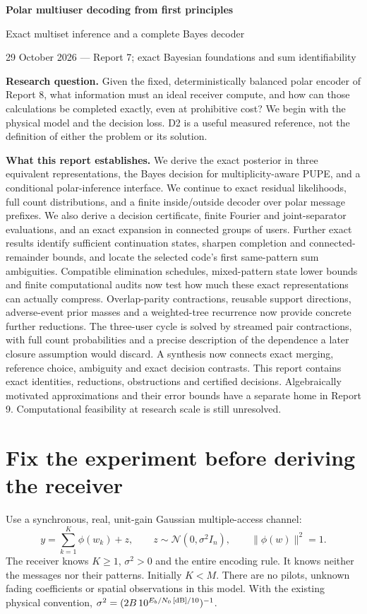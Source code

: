 \documentclass[10pt,a4paper]{article}
\begin{document}
{\LARGE\bfseries Polar multiuser decoding from first principles}\par
{\large Exact multiset inference and a complete Bayes decoder}\par
{\color{muted}29 October 2026 --- Report 7; exact Bayesian foundations and sum identifiability}

\textbf{Research question.} Given the fixed, deterministically balanced polar encoder of Report 8, what information
must an ideal receiver compute, and how can those calculations be completed exactly, even at prohibitive cost?
We begin with the physical model and the decision loss. D2 is a useful measured reference, not the
definition of either the problem or its solution.

\textbf{What this report establishes.} We derive the exact posterior in three equivalent representations, the
Bayes decision for multiplicity-aware PUPE, and a conditional polar-inference interface. We continue to exact
residual likelihoods, full count distributions, and a finite inside/outside decoder over polar message prefixes.
We also derive a decision certificate, finite Fourier and joint-separator evaluations, and an exact expansion
in connected groups of users. Further exact results identify sufficient continuation states, sharpen completion
and connected-remainder bounds, and locate the selected code's first same-pattern sum ambiguities.
Compatible elimination schedules, mixed-pattern state lower bounds and finite computational audits now test
how much these exact representations can actually compress. Overlap-parity contractions, reusable support
directions, adverse-event prior masses and a weighted-tree recurrence now provide concrete further reductions.
The three-user cycle is solved by streamed pair contractions, with full count probabilities and a precise
description of the dependence a later closure assumption would discard. A synthesis now connects exact merging,
reference choice, ambiguity and exact decision contrasts. This report contains exact identities, reductions,
obstructions and certified decisions. Algebraically motivated approximations and their error bounds have a
separate home in Report 9. Computational feasibility at research scale is still unresolved.

\section{Fix the experiment before deriving the receiver}
Use a synchronous, real, unit-gain Gaussian multiple-access channel:
\begin{equation}
 y=\sum_{k=1}^K\phi(w_k)+z,\qquad z\sim\mathcal N(0,\sigma^2 I_n),\qquad \|\phi(w)\|^2=1.
 \label{eq:model}
\end{equation}
The receiver knows $K\geq1$, $\sigma^2>0$ and the entire encoding rule. It knows neither the messages nor their
patterns. Initially $K<M$. There are no pilots, unknown fading coefficients or spatial observations in this model.
With the existing physical convention, $\sigma^2=(2B\,10^{E_b/N_0\,[{\rm dB}]/10})^{-1}$.
\end{document}

